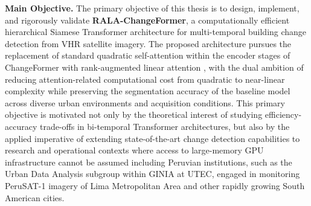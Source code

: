 \noindent\textbf{Main Objective.} The primary objective of this thesis is to design, implement, and rigorously validate \textbf{RALA-ChangeFormer}, a computationally efficient hierarchical Siamese Transformer architecture for multi-temporal building change detection from \ac{VHR} satellite imagery. The proposed architecture pursues the replacement of standard quadratic self-attention within the encoder stages of ChangeFormer with rank-augmented linear attention \cite{Fan2025RALA}, with the dual ambition of reducing attention-related computational cost from quadratic to near-linear complexity while preserving the segmentation accuracy of the baseline model across diverse urban environments and acquisition conditions. This primary objective is motivated not only by the theoretical interest of studying efficiency-accuracy trade-offs in bi-temporal Transformer architectures, but also by the applied imperative of extending state-of-the-art change detection capabilities to research and operational contexts where access to large-memory \ac{GPU} infrastructure cannot be assumed including Peruvian institutions, such as the Urban Data Analysis subgroup within GINIA at UTEC, engaged in monitoring PeruSAT-1 imagery of Lima Metropolitan Area and other rapidly growing South
American cities.

